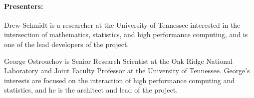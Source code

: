 \documentclass[11pt, a4paper]{article}
\newcommand{\pbdR}{%
\textbf{\color{pbdgrn}{p}\color{pbdrd}{b}\color{pbdylw}{d}\color{pbdblu}{R}}%
\xspace}
\begin{document}
\paragraph{Presenters:}
Drew Schmidt is a researcher at the University of Tennessee interested in the 
intersection of mathematics, statistics, and high performance computing, and is 
one of the lead developers of the \pbdR project.

George Ostrouchov is Senior Research Scientist at the Oak Ridge National
Laboratory and Joint Faculty Professor at the University of
Tennessee. George's interests are focused on the interaction of high
performance computing and statistics, and he is the architect and lead
of the \pbdR project.
\end{document}
